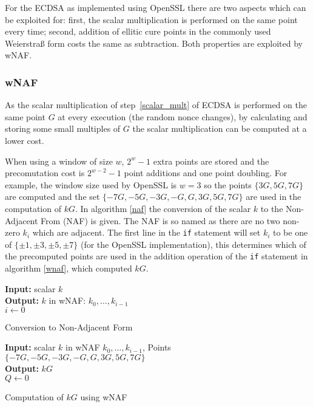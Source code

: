 \documentclass[twocolumn]{article}
\newcommand{\myupcase}[1]{\uppercase{#1}}
\begin{document}
For the \myupcase{ecdsa} as implemented using OpenSSL there are two aspects which can be exploited for: first, the scalar multiplication is performed on the same point every time; second, addition of ellitic cure points in the commonly used Weierstra{\ss} form costs the same as subtraction. Both properties are exploited by wNAF.

\subsubsection{wNAF}

As the scalar multiplication of  step~\ref{scalar_mult} of \myupcase{ecdsa} is performed on the same point $G$ at every execution (the random nonce changes), by calculating and storing some small multiples of $G$ the scalar multiplication can be computed at a lower cost.

When using a window of size $w$, $2^w-1$ extra points are stored and the precomutation cost is $2^{w-2}-1$ point additions and one point doubling. For example, the window size used by OpenSSL is $w=3$ so the points $\{3G,5G,7G\}$ are computed and the set $\{-7G,-5G,-3G,-G,G,3G,5G,7G\}$ are used in the computation of $kG$. In algorithm \ref{naf} the conversion of the scalar $k$ to the Non-Adjacent From (NAF) is given. The NAF is so named as there are no two non-zero $k_i$ which are adjacent. The first line in the \texttt{if} statement will set $k_i$ to be one of $\{\pm1,\pm3,\pm5,\pm7\}$ (for the OpenSSL implementation), this determines which of the precomputed points are used in the addition operation of the \texttt{if} statement in algorithm \ref{wnaf}, which computed $kG$.\\


\begin{algorithm}[htb]\label{naf}
\SetAlgoLined
{\bf Input:} scalar $k$\\
{\bf Output:} $k$ in wNAF: $k_0,\ldots,k_{i-1}$\\
$i\gets 0$\\
\caption{Conversion to Non-Adjacent Form}
\end{algorithm}\vspace{-0.5cm}

\begin{algorithm}[htb]\label{wnaf}
\SetAlgoLined
{\bf Input:} scalar $k$ in wNAF $k_0,\ldots,k_{i-1}$, Points $\{-7G,-5G,-3G,-G,G,3G,5G,7G\}$\\
{\bf Output:} $kG$\\
$Q\gets \mathcal{0}$\\
\caption{Computation of $kG$ using wNAF}
\end{algorithm}\vspace{-0.5cm}
\end{document}
